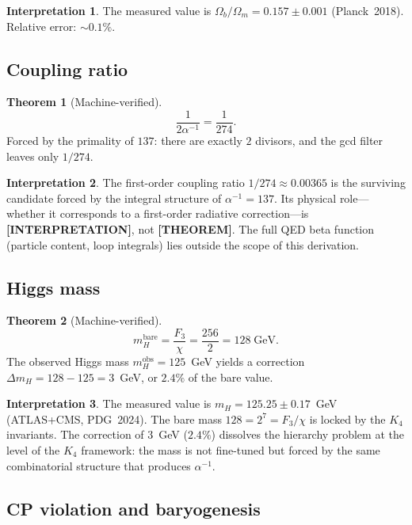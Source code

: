 \documentclass[11pt,a4paper]{article}
\newcommand{\THEOREM}{\textcolor{blue!70!black}{\textbf{[THEOREM]}}}
\newcommand{\INTERP}{\textcolor{orange!80!black}{\textbf{[INTERPRETATION]}}}
\theoremstyle{definition}
\newtheorem{theorem}{Theorem}[section]
\newtheorem*{interpretation}{Interpretation}
\begin{document}
\begin{interpretation}
The measured value is $\Omega_b / \Omega_m = 0.157 \pm 0.001$
(Planck~2018).  Relative error: $\sim 0.1\%$.
\end{interpretation}

\subsection{Coupling ratio}

\begin{theorem}[Machine-verified]
\[
  \frac{1}{2\alpha^{-1}} = \frac{1}{274}.
\]
Forced by the primality of $137$: there are exactly $2$ divisors, and
the gcd filter leaves only $1/274$.
\end{theorem}

\begin{interpretation}
The first-order coupling ratio $1/274 \approx 0.00365$ is the surviving
candidate forced by the integral structure of $\alpha^{-1} = 137$.
Its physical role---whether it corresponds to a first-order radiative
correction---is \INTERP, not \THEOREM.  The full QED beta function
(particle content, loop integrals) lies outside the scope of this
derivation.
\end{interpretation}

\subsection{Higgs mass}

\begin{theorem}[Machine-verified]
\[
  m_H^{\mathrm{bare}} = \frac{F_3}{\chi} = \frac{256}{2} = 128 \;\text{GeV}.
\]
The observed Higgs mass $m_H^{\mathrm{obs}} = 125$~GeV yields a
correction $\Delta m_H = 128 - 125 = 3$~GeV, or $2.4\%$ of the bare value.
\end{theorem}

\begin{interpretation}
The measured value is $m_H = 125.25 \pm 0.17$~GeV (ATLAS+CMS, PDG~2024).
The bare mass $128 = 2^7 = F_3 / \chi$ is locked by the $K_4$ invariants.
The correction of $3$~GeV ($2.4\%$) dissolves the hierarchy problem
at the level of the $K_4$ framework: the mass is not fine-tuned but
forced by the same combinatorial structure that produces $\alpha^{-1}$.
\end{interpretation}

\subsection{CP violation and baryogenesis}
\end{document}

